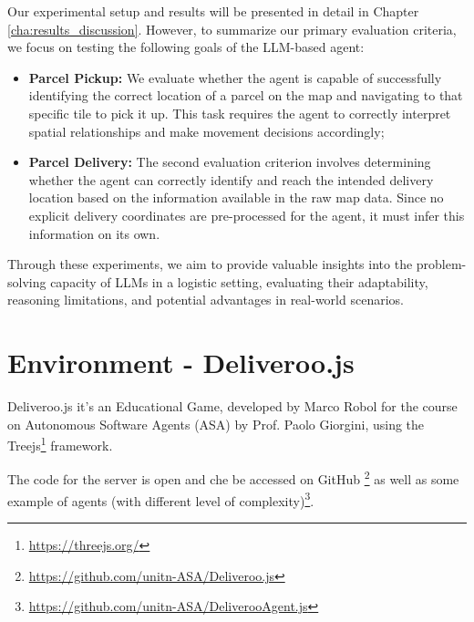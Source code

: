 Our experimental setup and results will be presented in detail in Chapter
\ref{cha:results_discussion}. However, to summarize our primary evaluation
criteria, we focus on testing the following goals of the LLM-based agent:

\begin{itemize}
  \item \textbf{Parcel Pickup:} We evaluate whether the agent is capable of
    successfully identifying the correct location of a parcel on the map and
    navigating to that specific tile to pick it up. This task requires the agent
    to correctly interpret spatial relationships and make movement decisions accordingly;

  \item \textbf{Parcel Delivery:} The second evaluation criterion involves
    determining whether the agent can correctly identify and reach the intended
    delivery location based on the information available in the raw map data. Since
    no explicit delivery coordinates are pre-processed for the agent, it must
    infer this information on its own.
\end{itemize}

Through these experiments, we aim to provide valuable insights into the problem-solving
capacity of LLMs in a logistic setting, evaluating their adaptability, reasoning
limitations, and potential advantages in real-world scenarios.

\section{Environment - Deliveroo.js}
\label{sec:environment_deliveroo_js}

Deliveroo.js it's an Educational Game, developed by Marco Robol for the course
on Autonomous Software Agents (ASA) by Prof. Paolo Giorgini, using the Treejs\footnote{\url{https://threejs.org/}}
framework.

The code for the server is open and che be accessed on GitHub \footnote{\url{https://github.com/unitn-ASA/Deliveroo.js}}
as well as some example of agents (with different level of complexity)\footnote{\url{https://github.com/unitn-ASA/DeliverooAgent.js}}.

